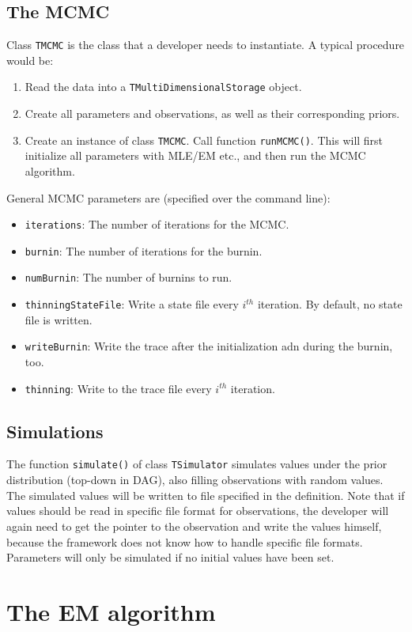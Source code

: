 \documentclass[a4paper,11pt]{article}
\newcommand{\class}[1]{\texttt{#1}}
\newcommand{\privparam}[1]{\texttt{\textunderscore #1}}
\newcommand{\pubfunc}[1]{\texttt{#1()}}
\begin{document}
\subsection{The MCMC}
Class \class{TMCMC} is the class that a developer needs to instantiate. A typical procedure would be:
\begin{enumerate}
 \item Read the data into a \class{TMultiDimensionalStorage} object.
 \item Create all parameters and observations, as well as their corresponding priors.
 \item Create an instance of class \class{TMCMC}. Call function \pubfunc{runMCMC}. This will first initialize all parameters with MLE/EM etc., and then run the MCMC algorithm.
\end{enumerate}
General MCMC parameters are (specified over the command line):
\begin{itemize}
 \item \privparam{iterations}: The number of iterations for the MCMC.
 \item \privparam{burnin}: The number of iterations for the burnin.
 \item \privparam{numBurnin}: The number of burnins to run.
 \item \privparam{thinningStateFile}: Write a state file every $i^{th}$ iteration. By default, no state file is written.
 \item \privparam{writeBurnin}: Write the trace after the initialization adn during the burnin, too.
 \item \privparam{thinning}: Write to the trace file every $i^{th}$ iteration.
\end{itemize}

\subsection{Simulations}
The function \pubfunc{simulate} of class \class{TSimulator} simulates values under the prior distribution (top-down in DAG), also filling observations with random values. The simulated values will be written to file specified in the definition. Note that if values should be read in specific file format for observations, the developer will again need to get the pointer to the observation and write the values himself, because the framework does not know how to handle specific file formats. Parameters will only be simulated if no initial values have been set.

\section{The EM algorithm}\label{em}
\end{document}
